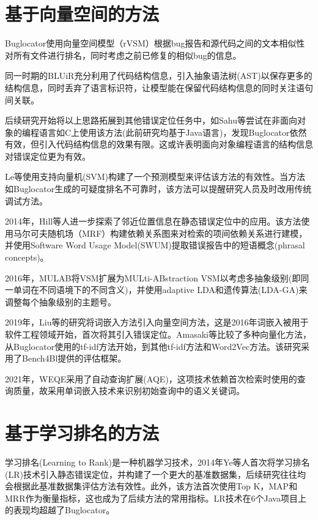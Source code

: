 \section{基于向量空间的方法}
Buglocator\cite{6227210}使用向量空间模型（rVSM）根据bug报告和源代码之间的文本相似性对所有文件进行排名，同时考虑之前已修复的相似bug的信息。

同一时期的BLUiR\cite{6693093}充分利用了代码结构信息，引入抽象语法树(AST)以保存更多的结构信息，同时丢弃了语言标识符，让模型能在保留代码结构信息的同时关注语句间关联。

后续研究开始将以上思路拓展到其他错误定位任务中，如Sahu等\cite{6976082}尝试在非面向对象的编程语言如C上使用该方法(此前研究均基于Java语言)，发现Buglocator依然有效，但引入代码结构信息的效果有限。这或许表明面向对象编程语言的结构信息对错误定位更为有效。

Le等\cite{6982639}使用支持向量机(SVM)构建了一个预测模型来评估该方法的有效性。当方法如Buglocator生成的可疑度排名不可靠时，该方法可以提醒研究人员及时改用传统调试方法。

2014年，Hill等人\cite{6747185}进一步探索了邻近位置信息在静态错误定位中的应用。该方法使用马尔可夫随机场（MRF）构建依赖关系图来对检索的项间依赖关系进行建模，并使用Software Word Usage Model(SWUM)\cite{hill2010integrating}提取错误报告中的短语概念(phrasal concepts)。

2016年，MULAB\cite{7816459}将VSM扩展为MULti-ABstraction VSM以考虑多抽象级别(即同一单词在不同语境下的不同含义)，并使用adaptive LDA和遗传算法(LDA-GA)来调整每个抽象级别的主题号。

2019年，Liu等\cite{8736209}的研究将词嵌入方法引入向量空间方法，这是2016年词嵌入被用于软件工程领域开始，首次将其引入错误定位。Amasaki等\cite{8906763}比较了多种向量化方法，从Buglocator使用的tf-idf方法开始，到其他tf-idf方法和Word2Vec方法。该研究采用了Bench4Bl提供的评估框架。

2021年，WEQE\cite{9700273}采用了自动查询扩展(AQE)，这项技术依赖首次检索时使用的查询质量，故采用单词嵌入技术来识别初始查询中的语义关键词。
\section{基于学习排名的方法}
学习排名(Learning to Rank)是一种机器学习技术，2014年Ye等人\cite{10.1145/2635868.2635874}首次将学习排名(LR)技术引入静态错误定位，并构建了一个更大的基准数据集，后续研究往往均会根据此基准数据集评估方法有效性。此外，该方法首次使用Top K，MAP和MRR作为衡量指标，这也成为了后续方法的常用指标。LR技术在6个Java项目上的表现均超越了Buglocator。


